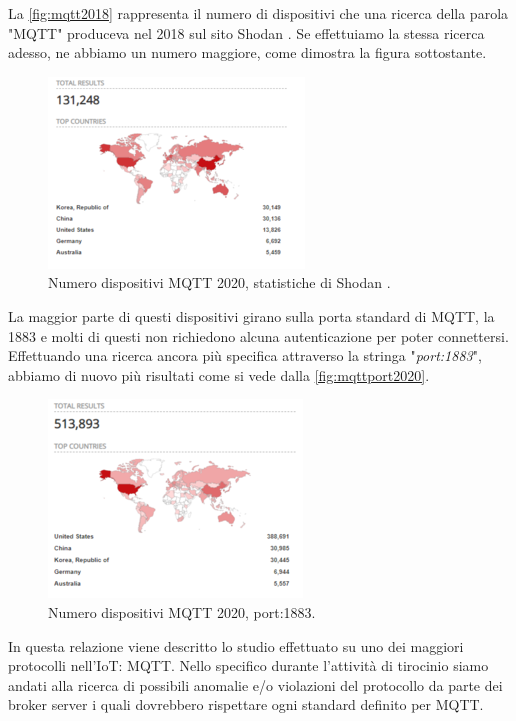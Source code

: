 \documentclass[binding=0.6cm,TFA]{sapthesis}
\begin{document}
\begin{large}
La \autoref{fig:mqtt2018} rappresenta il numero di dispositivi che una ricerca della parola "MQTT" produceva nel 2018 sul sito Shodan \cite{articleAvast}.
Se effettuiamo la stessa ricerca adesso, ne abbiamo un numero maggiore, come dimostra la figura sottostante.

\begin{figure}[h]
\centering
\includegraphics[scale=0.8]{images/mqtt-2020numbers.png}
\caption{Numero dispositivi MQTT 2020, statistiche di Shodan \cite{shodan}.}
\label{fig:mqtt2020}
\end{figure}

La maggior parte di questi dispositivi girano sulla porta standard di MQTT, la 1883 e molti di questi non richiedono alcuna autenticazione per poter connettersi. Effettuando una ricerca ancora più specifica attraverso la stringa "\textit{port:1883}", abbiamo di nuovo più risultati come si vede dalla \autoref{fig:mqttport2020}.\\

\begin{figure}[h]
\centering
\includegraphics[scale=0.8]{images/mqtt-2020port.png}
\caption{Numero dispositivi MQTT 2020, port:1883.}
\label{fig:mqttport2020}
\end{figure}

In questa relazione viene descritto lo studio effettuato su uno dei maggiori protocolli nell'IoT: MQTT. Nello specifico durante l'attività di tirocinio siamo andati alla ricerca di possibili anomalie e/o violazioni del protocollo da parte dei broker server i quali dovrebbero rispettare ogni standard definito per MQTT. \\


\end{large}
\end{document}
